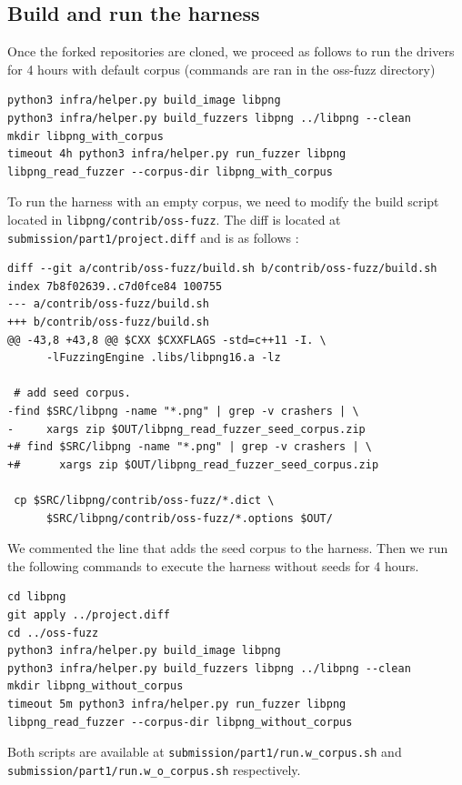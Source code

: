 \documentclass[11pt]{article}
\begin{document}
    \subsection{Build and run the harness}
    Once the forked repositories are cloned, we proceed as follows to run the drivers for 4 hours with default corpus (commands are ran in the oss-fuzz directory)
    \begin{lstlisting}
python3 infra/helper.py build_image libpng
python3 infra/helper.py build_fuzzers libpng ../libpng --clean
mkdir libpng_with_corpus
timeout 4h python3 infra/helper.py run_fuzzer libpng libpng_read_fuzzer --corpus-dir libpng_with_corpus
    \end{lstlisting}
    To run the harness with an empty corpus, we need to modify the build script located in \texttt{libpng/contrib/oss-fuzz}. The diff is located at \texttt{submission/part1/project.diff} and is as follows :
    \begin{lstlisting}
diff --git a/contrib/oss-fuzz/build.sh b/contrib/oss-fuzz/build.sh
index 7b8f02639..c7d0fce84 100755
--- a/contrib/oss-fuzz/build.sh
+++ b/contrib/oss-fuzz/build.sh
@@ -43,8 +43,8 @@ $CXX $CXXFLAGS -std=c++11 -I. \
      -lFuzzingEngine .libs/libpng16.a -lz
 
 # add seed corpus.
-find $SRC/libpng -name "*.png" | grep -v crashers | \
-     xargs zip $OUT/libpng_read_fuzzer_seed_corpus.zip
+# find $SRC/libpng -name "*.png" | grep -v crashers | \
+#      xargs zip $OUT/libpng_read_fuzzer_seed_corpus.zip
 
 cp $SRC/libpng/contrib/oss-fuzz/*.dict \
      $SRC/libpng/contrib/oss-fuzz/*.options $OUT/

    \end{lstlisting}
    We commented the line that adds the seed corpus to the harness.
    Then we run the following commands to execute the harness without seeds for 4 hours.
    \begin{lstlisting}
cd libpng
git apply ../project.diff
cd ../oss-fuzz
python3 infra/helper.py build_image libpng
python3 infra/helper.py build_fuzzers libpng ../libpng --clean
mkdir libpng_without_corpus
timeout 5m python3 infra/helper.py run_fuzzer libpng libpng_read_fuzzer --corpus-dir libpng_without_corpus
    \end{lstlisting}
    Both scripts are available at \texttt{submission/part1/run.w\_corpus.sh} and \texttt{submission/part1/run.w\_o\_corpus.sh} respectively.
\end{document}
